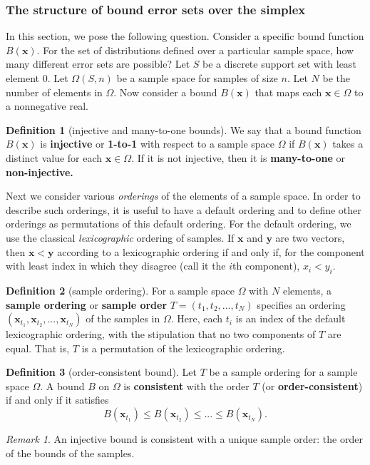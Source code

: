 \documentclass{article}
\theoremstyle{definition}
\newtheorem{definition}{Definition}[section]
\theoremstyle{remark}
\newtheorem{remark}[theorem]{Remark}
\newcommand{\y}{\mathbf{y}}
\def\y{\mathbf{y}}
\def\x{\mathbf{x}}
\begin{document}
\subsubsection{The structure of bound error sets over the simplex}
In this section, we pose the following question. Consider a specific bound function $B(\x)$. For the set of distributions defined over a particular sample space, how many different error sets are possible? Let $S$ be a discrete support set with least element 0. Let $\Omega(S,n)$ be a sample space for samples of size $n$.  Let $N$ be the number of elements in $\Omega$.
Now consider a bound $B(\x)$ that maps each $\x \in \Omega$ to a nonnegative real. 

\begin{definition}[injective and many-to-one bounds]
We say that a bound function $B(\x)$ is \textbf{injective} or {\bf 1-to-1} with respect to a sample space $\Omega$ if $B(\x)$ takes a distinct value for each $\x \in \Omega$. If it is not injective, then it is {\bf many-to-one} or {\bf non-injective.}
\end{definition}

Next we consider various {\em orderings} of the elements of a sample space. In order to describe such orderings, it is useful to have a default ordering and to define other orderings as permutations of this default ordering. For the default ordering, we use the classical {\em lexicographic} ordering of samples. If $\x$ and $\y$ are two vectors, then 
$\x<\y$ according to a lexicographic ordering if and only if, for the component with least index in which they disagree (call it the $i$th component), $x_i<y_i$.

\begin{definition}[sample ordering]
For a sample space $\Omega$ with $N$ elements, a \textbf{sample ordering} or \textbf{sample order} $T=(t_1, t_2,..., t_N)$ specifies an ordering $(\x_{t_1},\x_{t_2},...,\x_{t_N})$ of the samples in $\Omega$. Here, each $t_i$ is an index of the default lexicographic ordering, with the stipulation that no two components of $T$ are equal. That is, $T$ is a permutation of the lexicographic ordering.
\end{definition}

\begin{definition}[order-consistent bound]
\label{def:order_consistency}
Let $T$ be a sample ordering for a sample space $\Omega$. A bound $B$ on $\Omega$ is {\bf  consistent} with the order $T$ (or \textbf{order-consistent}) if and only if it satisfies
$$
B(\x_{t_1})\leq B(\x_{t_2}) \leq ... \leq B(\x_{t_N}).
$$
\end{definition}
\begin{remark}
\label{remark:injective}
    An injective bound is consistent with a unique sample order: the order of the bounds of the samples.
\end{remark}
\end{document}
